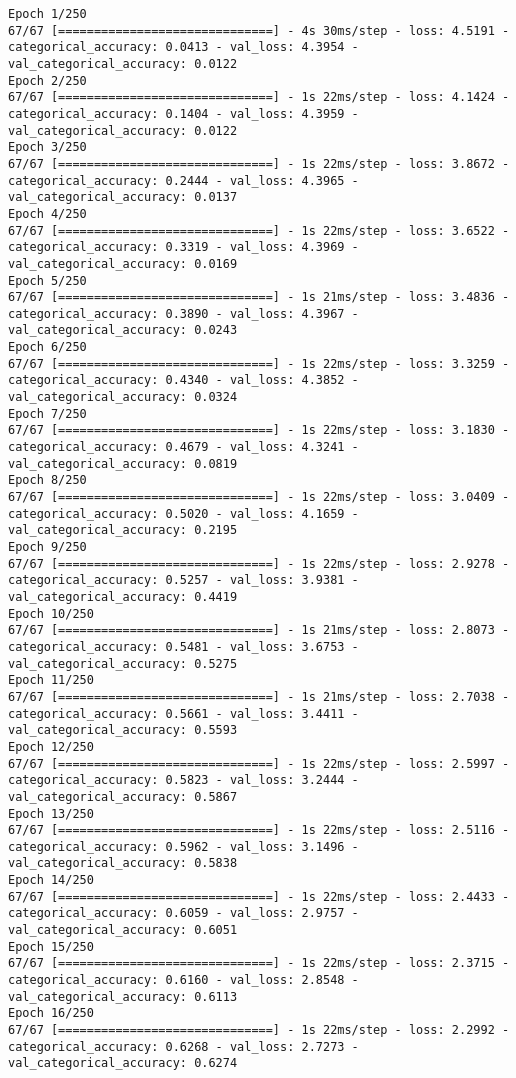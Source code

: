 \begin{lstlisting}
Epoch 1/250
67/67 [==============================] - 4s 30ms/step - loss: 4.5191 - categorical_accuracy: 0.0413 - val_loss: 4.3954 - val_categorical_accuracy: 0.0122
Epoch 2/250
67/67 [==============================] - 1s 22ms/step - loss: 4.1424 - categorical_accuracy: 0.1404 - val_loss: 4.3959 - val_categorical_accuracy: 0.0122
Epoch 3/250
67/67 [==============================] - 1s 22ms/step - loss: 3.8672 - categorical_accuracy: 0.2444 - val_loss: 4.3965 - val_categorical_accuracy: 0.0137
Epoch 4/250
67/67 [==============================] - 1s 22ms/step - loss: 3.6522 - categorical_accuracy: 0.3319 - val_loss: 4.3969 - val_categorical_accuracy: 0.0169
Epoch 5/250
67/67 [==============================] - 1s 21ms/step - loss: 3.4836 - categorical_accuracy: 0.3890 - val_loss: 4.3967 - val_categorical_accuracy: 0.0243
Epoch 6/250
67/67 [==============================] - 1s 22ms/step - loss: 3.3259 - categorical_accuracy: 0.4340 - val_loss: 4.3852 - val_categorical_accuracy: 0.0324
Epoch 7/250
67/67 [==============================] - 1s 22ms/step - loss: 3.1830 - categorical_accuracy: 0.4679 - val_loss: 4.3241 - val_categorical_accuracy: 0.0819
Epoch 8/250
67/67 [==============================] - 1s 22ms/step - loss: 3.0409 - categorical_accuracy: 0.5020 - val_loss: 4.1659 - val_categorical_accuracy: 0.2195
Epoch 9/250
67/67 [==============================] - 1s 22ms/step - loss: 2.9278 - categorical_accuracy: 0.5257 - val_loss: 3.9381 - val_categorical_accuracy: 0.4419
Epoch 10/250
67/67 [==============================] - 1s 21ms/step - loss: 2.8073 - categorical_accuracy: 0.5481 - val_loss: 3.6753 - val_categorical_accuracy: 0.5275
Epoch 11/250
67/67 [==============================] - 1s 21ms/step - loss: 2.7038 - categorical_accuracy: 0.5661 - val_loss: 3.4411 - val_categorical_accuracy: 0.5593
Epoch 12/250
67/67 [==============================] - 1s 22ms/step - loss: 2.5997 - categorical_accuracy: 0.5823 - val_loss: 3.2444 - val_categorical_accuracy: 0.5867
Epoch 13/250
67/67 [==============================] - 1s 22ms/step - loss: 2.5116 - categorical_accuracy: 0.5962 - val_loss: 3.1496 - val_categorical_accuracy: 0.5838
Epoch 14/250
67/67 [==============================] - 1s 22ms/step - loss: 2.4433 - categorical_accuracy: 0.6059 - val_loss: 2.9757 - val_categorical_accuracy: 0.6051
Epoch 15/250
67/67 [==============================] - 1s 22ms/step - loss: 2.3715 - categorical_accuracy: 0.6160 - val_loss: 2.8548 - val_categorical_accuracy: 0.6113
Epoch 16/250
67/67 [==============================] - 1s 22ms/step - loss: 2.2992 - categorical_accuracy: 0.6268 - val_loss: 2.7273 - val_categorical_accuracy: 0.6274

\end{lstlisting}
